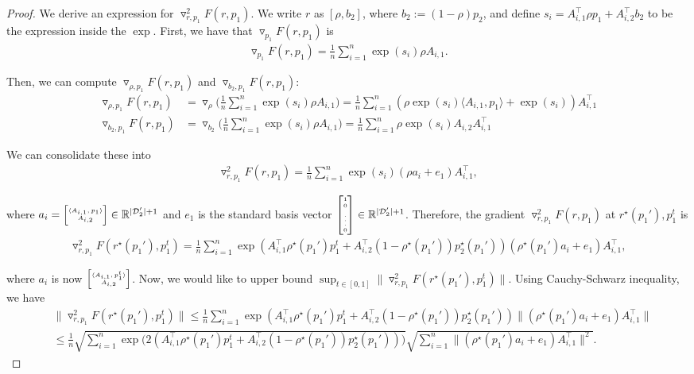 \documentclass[table]{ai2style/ai2}
\newcommand{\D}[0]{\mathcal{D}}
\newcommand{\R}[0]{\mathbb{R}}
\newcommand\SmallMatrix[1]{{
\tiny\arraycolsep=0.3\arraycolsep\ensuremath{\begin{bmatrix}#1\end{bmatrix}}}}
\begin{document}
\begin{proof}
We derive an expression for $\triangledown_{r, p_1}^2 F(r, p_1)$. 
We write $r$ as $[\rho, b_2]$, where $b_2 := (1 - \rho) p_2$, and define $s_i = A_{i, 1}^\top \rho p_1 + A_{i, 2}^\top b_2$ to be the expression inside the $\exp$. First, we have that $\triangledown_{p_1} F(r, p_1)$ is
\begin{align*}
    \triangledown_{p_1} F(r, p_1) = \frac{1}{n} \sum_{i = 1}^n \exp(s_i) \rho A_{i, 1}.  \nonumber
\end{align*}

Then, we can compute $\triangledown_{\rho, p_1} F(r, p_1)$ and $\triangledown_{b_2, p_1} F(r, p_1)$:
\begin{align*}
    \triangledown_{\rho, p_1} F(r, p_1) &= \triangledown_{\rho} \bigg(\frac{1}{n}\sum_{i = 1}^n \exp(s_i) \rho A_{i, 1} \bigg) = \frac{1}{n} \sum_{i= 1}^n (\rho \exp(s_i) \langle A_{i, 1}, p_1 \rangle + \exp(s_i)) A_{i, 1}^\top \nonumber \\
    \triangledown_{b_2, p_1} F(r, p_1) &= \triangledown_{b_2} \bigg(\frac{1}{n}\sum_{i = 1}^n \exp(s_i) \rho A_{i, 1} \bigg) = \frac{1}{n} \sum_{i = 1}^n \rho \exp(s_i) A_{i, 2} A_{i, 1}^\top \nonumber
\end{align*}

We can consolidate these into
\begin{align*}
    \triangledown_{r, p_1}^2 F(r, p_1) = \frac{1}{n}\sum_{i = 1}^n \exp(s_i) (\rho a_i + e_1) A_{i, 1}^\top, \nonumber
\end{align*}

where $a_i = \SmallMatrix{\langle A_{i, 1}, p_1 \rangle \\ A_{i, 2}}  \in \R^{|\D_2'| + 1}$ and $e_1$ is the standard basis vector $\SmallMatrix{1 \\ 0 \\ \vdots \\ 0} \in \R^{|\D_2'| + 1}$. Therefore, the gradient $\triangledown_{r, p_1}^2 F(r, p_1)$ at $r^\star(p_1'), p_1^t$ is
\begin{align*}
    \triangledown_{r, p_1}^2 F(r^\star(p_1'), p_1^t) = \frac{1}{n}\sum_{i = 1}^n \exp(A_{i, 1}^\top \rho^\star(p_1') p_1^t + A_{i, 2}^\top (1 - \rho^\star(p_1')) p_2^\star(p_1')) (\rho^\star(p_1') a_i + e_1) A_{i, 1}^\top,
\end{align*}

where $a_i$ is now $\SmallMatrix{\langle A_{i, 1}, p_1^t \rangle \\ A_{i, 2}}$. Now, we would like to upper bound $ \sup _{t \in [0, 1]} \|\triangledown_{r, p_1}^2 F(r^\star(p_1'), p_1^t) \|$. Using Cauchy-Schwarz inequality, we have
\begin{align}
    &\|\triangledown_{r, p_1}^2 F(r^\star(p_1'), p_1^t) \| \le \frac{1}{n}\sum_{i = 1}^n \exp(A_{i, 1}^\top \rho^\star(p_1') p_1^t + A_{i, 2}^\top (1 - \rho^\star(p_1')) p_2^\star(p_1')) \|(\rho^\star(p_1') a_i + e_1) A_{i, 1}^\top \| \nonumber \\
    &\le \frac{1}{n} \sqrt{\sum_{i = 1}^n \exp\big(2 (A_{i, 1}^\top \rho^\star(p_1') p_1^t + A_{i, 2}^\top (1 - \rho^\star(p_1')) p_2^\star(p_1'))\big)} \sqrt{\sum_{i=1}^n \|(\rho^\star(p_1') a_i + e_1) A_{i, 1}^\top \|^2}. \label{eq:m_bound}
\end{align}


\end{proof}
\end{document}
